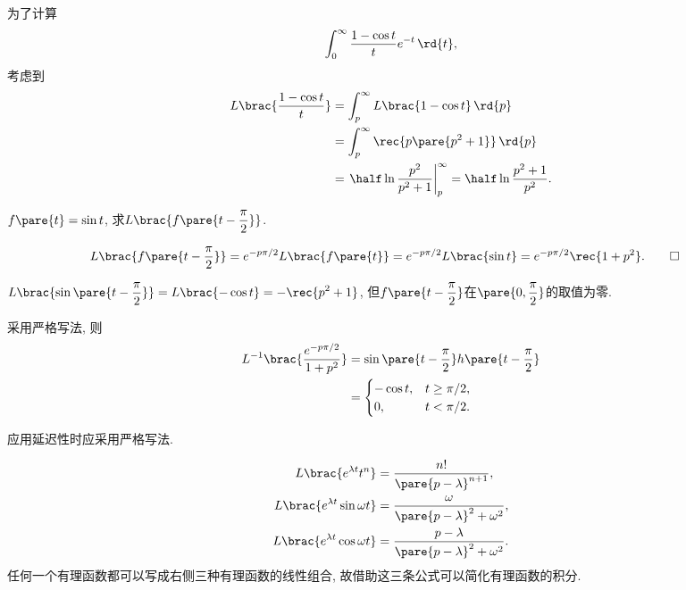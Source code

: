 \documentclass[../ComplexVariable.tex]{subfiles}
\begin{document}
\begin{sample}
    \begin{ex}
        为了计算
        \[ \int_0^\infty \frac{1-\cos t}{t}e^{-t}\,\rd{t}, \]
        考虑到
        \begin{align*}
            L\brac{\frac{1-\cos t}{t}} &= \int_p^\infty L\brac{1-\cos t}\,\rd{p} \\
            &= \int_p^\infty \rec{p\pare{p^2+1}}\,\rd{p} \\
            &= \left. \half\ln \frac{p^2}{p^2+1}\right\vert_p^\infty = \half \ln \frac{p^2+1}{p^2}.
        \end{align*}
    \end{ex}
\end{sample}
\begin{sample}
    \begin{ex}
        $f\pare{t} = \sin t$, 求$\displaystyle L\brac{f\pare{t-\frac{\pi}{2}}}$.
    \end{ex}
    \begin{solution}
        \begin{align*}
            L\brac{f\pare{t-\frac{\pi}{2}}} &= e^{-p\pi/2}L\brac{f\pare{t}} = e^{-p\pi/2}L\brac{\sin t} = e^{-p\pi/2} \rec{1+p^2}. \qedhere
        \end{align*}
    \end{solution}
    \begin{remark}
        $\displaystyle L\brac{\sin\pare{t - \frac{\pi}{2}}} = L\brac{-\cos t} = -\rec{p^2+1}$, 但$\displaystyle f\pare{t-\frac{\pi}{2}}$在$\displaystyle \pare{0,\frac{\pi}{2}}$的取值为零.
    \end{remark}
    \begin{remark}
        采用严格写法, 则
        \begin{align*}
            L^{-1}\brac{\frac{e^{-p\pi/2}}{1+p^2}} &= \sin \pare{t-\frac{\pi}{2}} h\pare{t-\frac{\pi}{2}} \\
            &= \begin{cases}
                -\cos t, & t\ge \pi/2, \\
                0, & t<\pi/2.
            \end{cases}
        \end{align*}
    \end{remark}
\end{sample}
\begin{pitfall}
    应用延迟性时应采用严格写法.
\end{pitfall}
\begin{sample}
    \begin{ex}
        \begin{align*}
            L\brac{e^{\lambda t}t^n} &= \frac{n!}{\pare{p-\lambda}^{n+1}}, \\
            L\brac{e^{\lambda t}\sin \omega t} &= \frac{\omega}{\pare{p-\lambda}^2 + \omega^2}, \\
            L\brac{e^{\lambda t}\cos \omega t} &= \frac{p-\lambda}{\pare{p-\lambda}^2 + \omega^2}.
        \end{align*}
        任何一个有理函数都可以写成右侧三种有理函数的线性组合, 故借助这三条公式可以简化有理函数的积分.
    \end{ex}
\end{sample}
\end{document}
